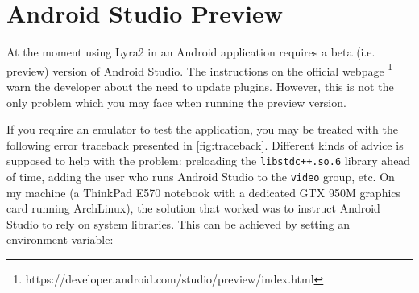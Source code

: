 \chapter{Android Studio Preview}
\label{chapter:problem?}

At the moment using Lyra2 in an Android application requires a beta (i.e. preview) version of Android Studio. The instructions on the official webpage \footnote{https://developer.android.com/studio/preview/index.html} warn the developer about the need to update plugins. However, this is not the only problem which you may face when running the preview version.

If you require an emulator to test the application, you may be treated with the following  error traceback presented in \ref{fig:traceback}. Different kinds of advice is supposed to help with the problem: preloading the \texttt{libstdc++.so.6} library ahead of time, adding the user who runs Android Studio to the \texttt{video} group, etc. On my machine (a ThinkPad E570 notebook with a dedicated GTX 950M graphics card running ArchLinux), the solution that worked was to instruct Android Studio to rely on system libraries. This can be achieved by setting an environment variable:
